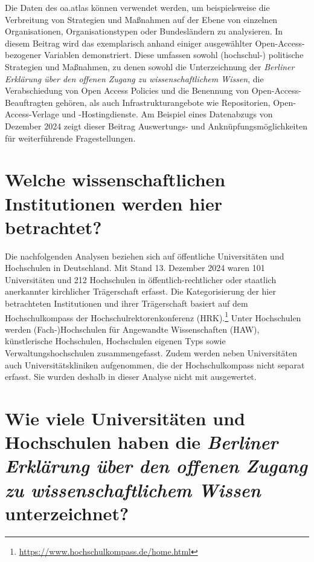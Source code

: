 \documentclass[a4paper,
fontsize=11pt,
oneside,
numbers=noperiodatend,
parskip=half-,
bibliography=totoc,
final
]{scrartcl}
\begin{document}
Die Daten des oa.atlas können verwendet werden, um beispielsweise die
Verbreitung von Strategien und Maßnahmen auf der Ebene von einzelnen
Organisationen, Organisationstypen oder Bundesländern zu analysieren. In
diesem Beitrag wird das exemplarisch anhand einiger ausgewählter
Open-Access-bezogener Variablen demonstriert. Diese umfassen sowohl
(hochschul-) politische Strategien und Maßnahmen, zu denen sowohl die
Unterzeichnung der \emph{Berliner Erklärung über den offenen Zugang zu
wissenschaftlichem Wissen}, die Verabschiedung von Open Access Policies
und die Benennung von Open-Access-Beauftragten gehören, als auch
Infrastrukturangebote wie Repositorien, Open-Access-Verlage und
-Hostingdienste. Am Beispiel eines Datenabzugs von Dezember 2024 zeigt
dieser Beitrag Auswertungs- und Anknüpfungsmöglichkeiten für
weiterführende Fragestellungen.

\section{Welche wissenschaftlichen Institutionen werden hier
betrachtet?}\label{welche-wissenschaftlichen-institutionen-werden-hier-betrachtet}

Die nachfolgenden Analysen beziehen sich auf öffentliche Universitäten
und Hochschulen in Deutschland. Mit Stand 13. Dezember 2024 waren 101
Universitäten und 212 Hochschulen in öffentlich-rechtlicher oder
staatlich anerkannter kirchlicher Trägerschaft erfasst. Die
Kategorisierung der hier betrachteten Institutionen und ihrer
Trägerschaft basiert auf dem Hochschulkompass der
Hochschulrektorenkonferenz (HRK).\footnote{\url{https://www.hochschulkompass.de/home.html}}
Unter Hochschulen werden (Fach-)Hochschulen für Angewandte
Wissenschaften (HAW), künstlerische Hochschulen, Hochschulen eigenen
Typs sowie Verwaltungshochschulen zusammengefasst. Zudem werden neben
Universitäten auch Universitätskliniken aufgenommen, die der
Hochschulkompass nicht separat erfasst. Sie wurden deshalb in dieser
Analyse nicht mit ausgewertet.

\section{\texorpdfstring{Wie viele Universitäten und Hochschulen
haben die \emph{Berliner Erklärung über den offenen Zugang zu
wissenschaftlichem Wissen}
unterzeichnet?}{Wie viele Universitäten und Hochschulen haben die Berliner Erklärung über den offenen Zugang zu wissenschaftlichem Wissen unterzeichnet?}}\label{wie-viele-universituxe4ten-und-hochschulen-haben-die-berliner-erkluxe4rung-uxfcber-den-offenen-zugang-zu-wissenschaftlichem-wissen-unterzeichnet}
\end{document}
